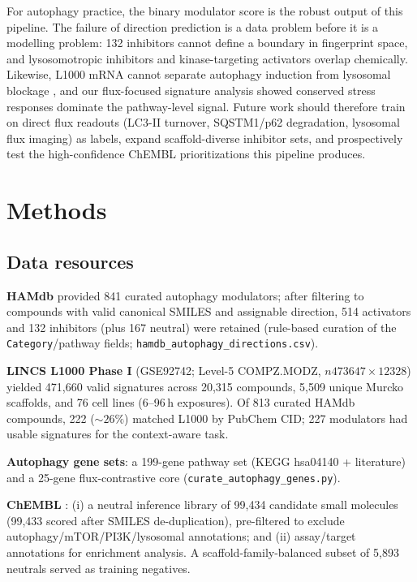 \documentclass[11pt]{article}
\begin{document}
For autophagy practice, the binary modulator score is the robust output of
this pipeline. The failure of direction prediction is a data problem before
it is a modelling problem: 132 inhibitors cannot define a boundary in
fingerprint space, and lysosomotropic inhibitors and kinase-targeting
activators overlap chemically. Likewise, L1000 mRNA cannot separate autophagy
induction from lysosomal blockage \cite{klionsky2021guidelines}, and our
flux-focused signature analysis showed conserved stress responses dominate
the pathway-level signal. Future work should therefore train on direct flux
readouts (LC3-II turnover, SQSTM1/p62 degradation, lysosomal flux imaging) as
labels, expand scaffold-diverse inhibitor sets, and prospectively test the
high-confidence ChEMBL prioritizations this pipeline produces.

\section*{Methods}

\subsection*{Data resources}

\textbf{HAMdb} \cite{wang2018hamdb} provided 841 curated autophagy modulators;
after filtering to compounds with valid canonical SMILES and assignable
direction, 514 activators and 132 inhibitors (plus 167 neutral) were retained
(rule-based curation of the \texttt{Category}/pathway fields;
\texttt{hamdb\_autophagy\_directions.csv}).

\textbf{LINCS L1000 Phase I} (GSE92742; Level-5 COMPZ.MODZ,
$n473647\times12328$) \cite{subramanian2017} yielded 471{,}660 valid
signatures across 20{,}315 compounds, 5{,}509 unique Murcko scaffolds, and 76
cell lines (6--96\,h exposures). Of 813 curated HAMdb compounds, 222
(${\sim}26\%$) matched L1000 by PubChem CID; 227 modulators had usable
signatures for the context-aware task.

\textbf{Autophagy gene sets}: a 199-gene pathway set (KEGG hsa04140 +
literature) and a 25-gene flux-contrastive core (\texttt{curate\_autophagy\_genes.py}).

\textbf{ChEMBL} \cite{mendez2019}: (i) a neutral inference library of
99{,}434 candidate small molecules (99{,}433 scored after SMILES
de-duplication), pre-filtered to exclude autophagy/mTOR/PI3K/lysosomal
annotations; and (ii) assay/target annotations for enrichment analysis. A
scaffold-family-balanced subset of 5{,}893 neutrals served as training
negatives.
\end{document}
